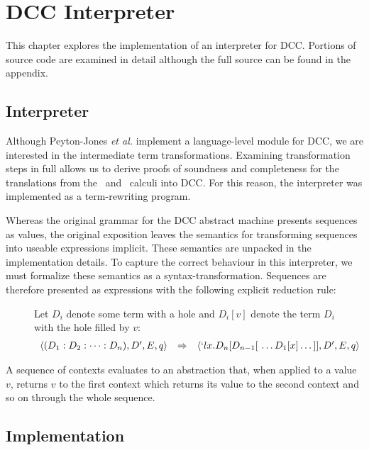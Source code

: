 \chapter{DCC Interpreter}

This chapter explores the implementation of an interpreter for DCC. Portions of source code are examined in detail although the full source can be found in the appendix.

\section{Interpreter}

Although Peyton-Jones \emph{et al.} implement a language-level module for DCC, we are interested in the intermediate term transformations. Examining transformation steps in full allows us to derive proofs of soundness and completeness for the translations from the \lam\ and \lmu\ calculi into DCC. For this reason, the interpreter was implemented as a term-rewriting program.

Whereas the original grammar for the DCC abstract machine presents sequences as values, the original exposition leaves the semantics for transforming sequences into useable expressions implicit. These semantics are unpacked in the implementation details. To capture the correct behaviour in this interpreter, we must formalize these semantics as a syntax-transformation. Sequences are therefore presented as expressions with the following explicit reduction rule:

\begin{figure}[!h]
\begin{definition}
\item Let $D_i$ denote some term with a hole and $D_i[v]$ denote the term $D_i$ with the hole filled by $v$:
\[
\begin{array}{rclr}
  \langle 
    (D_1:D_2:\dots:D_n) ,
    D^\prime,
    E,
    q
  \rangle 
    &\Rightarrow&
  \langle 
    `lx.D_n[D_{n-1}[\ \dots D_1[x]\dots ]],
    D^\prime,
    E,
    q
  \rangle 
\end{array}
\]
\end{definition}
\end{figure}

A sequence of contexts evaluates to an abstraction that, when applied to a value $v$, returns $v$ to the first context which returns its value to the second context and so on through the whole sequence.
 
\section{Implementation}

